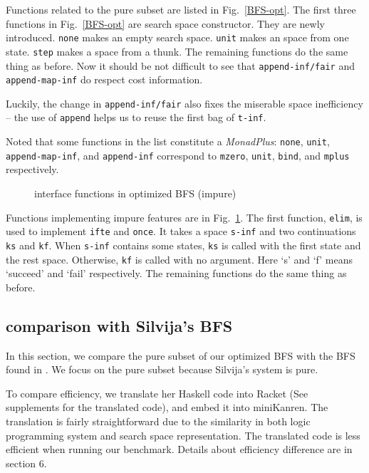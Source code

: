 \documentclass[format=acmlarge, review=true, authordraft=true]{acmart}
\begin{document}
Functions related to the pure subset are listed in Fig.~\ref{BFS-opt}. The 
first three functions in Fig.~\ref{BFS-opt} are search space constructor. 
They are newly introduced. \texttt{none} makes an empty search space. 
\texttt{unit} makes an space from one state. \texttt{step} makes a space from a 
thunk. The remaining functions do the same thing as 
before. Now it should be not difficult to see that \texttt{append-inf/fair} and 
\texttt{append-map-inf} do respect cost information.

Luckily, the change in \texttt{append-inf/fair} also fixes the miserable space 
inefficiency -- the use of \texttt{append} helps us to reuse the first bag of 
\texttt{t-inf}.

Noted that some functions in the list constitute a \emph{MonadPlus}: 
\texttt{none}, \texttt{unit}, \texttt{append-map-inf}, and \texttt{append-inf} 
correspond to \texttt{mzero}, \texttt{unit}, \texttt{bind}, and \texttt{mplus} 
respectively.

\begin{figure}
		
	\caption{interface functions in optimized BFS (impure)}
	\label{BFS-opt-cont}
\end{figure}

Functions implementing impure features are in Fig.~\ref{BFS-opt-cont}. The 
first function, \texttt{elim}, is used to implement \texttt{ifte} and 
\texttt{once}. It takes a space \texttt{s-inf} and two continuations 
\texttt{ks} and \texttt{kf}. When \texttt{s-inf} contains some states, 
\texttt{ks} is called with the first state and the rest space. Otherwise, 
\texttt{kf} is called with no argument. Here `s' and `f' means `succeed' and 
`fail' respectively. The remaining functions do the same thing as before.

\subsection{comparison with Silvija's BFS}

In this section, we compare the pure subset of our optimized BFS with the BFS 
found in \citep{seres1999algebra}. We focus on the pure subset because 
Silvija's system is pure. 

To compare efficiency, we translate her Haskell code into Racket (See 
supplements for the translated code), and embed it into miniKanren. The 
translation is fairly straightforward due to the similarity in both logic 
programming system and search space representation. The translated code is less 
efficient when running our benchmark. Details about efficiency difference are 
in section 6.
\end{document}
